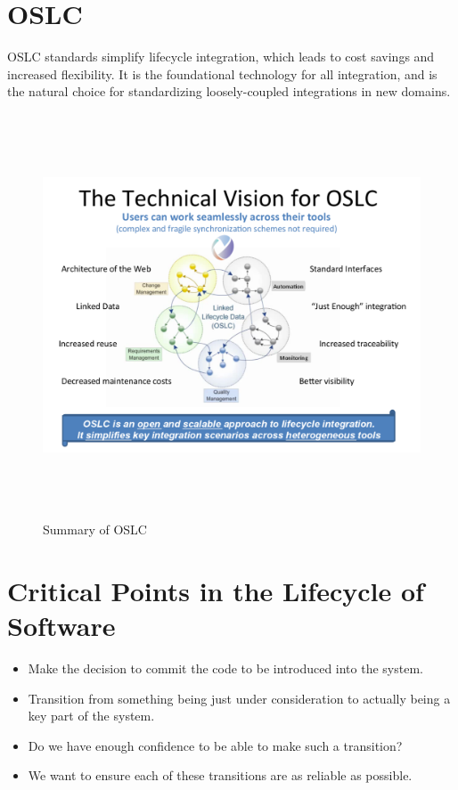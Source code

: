 \documentclass[a4paper]{report}
\begin{document}
\section{OSLC}
OSLC standards simplify lifecycle integration, which leads to cost savings and increased flexibility.
It is the foundational technology for all integration, and is the natural choice for standardizing loosely-coupled integrations in new domains. 

\begin{figure}[h]
\begin{center} 
    \includegraphics[scale=0.8,width = 15cm, height = 12cm]{images/OSLC.pdf}
    \caption{Summary of OSLC}
\end{center}
\end{figure}

\section{Critical Points in the Lifecycle of Software}
\begin{itemize}
\item  Make the decision to commit the code to be introduced into the system.
\item  Transition from something being just under consideration to actually being a key part of the system.
\item  Do we have enough confidence to be able to make such a transition?
\item  We want to ensure each of these transitions are as reliable as possible. 
\end{itemize}
\end{document}
